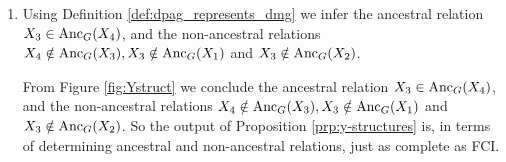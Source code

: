 \begin{enumerate}
\begin{gradedsolution}
\begin{enumerate}
\begin{enumerate}[label=\arabic*)]
\begin{center}
			\end{center}
			Then, rules $\Rcal2, \Rcal3, \Rcal4$ don't apply (check this!), so we continue.
			\item Rules $\Rcal8, \Rcal9, \Rcal10$ don't apply (check this!), so we continue.
			\item Output
			\begin{center}
			\end{center}
		\end{enumerate}
		\item Using Definition \ref*{def:dpag_represents_dmg} we infer the ancestral relation $X_3 \in \mathrm{Anc}_G(X_4)$, and the non-ancestral relations $X_4 \notin \mathrm{Anc}_G(X_3), X_3 \notin \mathrm{Anc}_G(X_1)$ and $X_3 \notin \mathrm{Anc}_G(X_2)$.
		
		From Figure \ref*{fig:Ystruct} we conclude the ancestral relation $X_3\in\mathrm{Anc}_G(X_4)$, and the non-ancestral relations $X_4 \notin \mathrm{Anc}_G(X_3), X_3 \notin \mathrm{Anc}_G(X_1)$ and $X_3 \notin \mathrm{Anc}_G(X_2)$. So the output of Proposition \ref*{prp:y-structures} is, in terms of determining ancestral and non-ancestral relations, just as complete as FCI.
	\end{enumerate}
\end{gradedsolution}
\end{enumerate}

